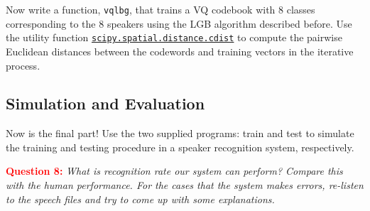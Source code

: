 \documentclass{article}
\begin{document}
Now write a function, \texttt{vqlbg}, that trains a VQ codebook  with 8 classes corresponding to the 8 speakers using the LGB algorithm described before.  Use the utility function \href{https://docs.scipy.org/doc/scipy/reference/generated/scipy.spatial.distance.cdist.html#scipy.spatial.distance.cdist}{\texttt{scipy.spatial.distance.cdist}} to compute the pairwise Euclidean distances between the codewords and training vectors in the iterative process.

\subsection{Simulation and Evaluation}
Now is the final part!  Use the two supplied programs: train and test to simulate the training and testing procedure in a speaker recognition system, respectively.

\textcolor{red}{\textbf{Question 8:}} \textit{What is recognition rate our system can perform?  Compare this with the human performance.  For the cases that the system makes errors, re-listen to the speech files and try to come up with some explanations.}
\end{document}
